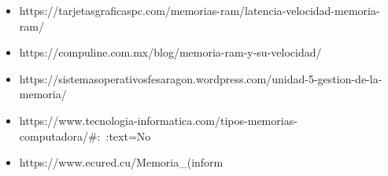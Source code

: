 \documentclass{article}
\begin{document}


\begin{itemize}
\item https://tarjetasgraficaspc.com/memorias-ram/latencia-velocidad-memoria-ram/
\item https://compuline.com.mx/blog/memoria-ram-y-su-velocidad/
\item https://sistemasoperativosfesaragon.wordpress.com/unidad-5-gestion-de-la-memoria/
\item https://www.tecnologia-informatica.com/tipos-memorias-computadora/#:~:text=No%
\item https://www.ecured.cu/Memoria_(inform%
\end{itemize}
\end{document}
